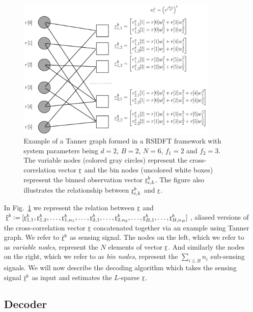 \begin{enumerate}
\begin{figure}[h!]
	\begin{center}
		\includegraphics[height=7cm]{Figures/Factorgraph} 
	\end{center}	   
	\caption{Example of a Tanner graph formed in a RSIDFT framework with system parameters being $d=2$, $B=2$, $N=6$, $f_1 = 2$ and $f_2=3$. The variable nodes (colored gray circles) represent the cross-correlation vector $\underline{\mathrm{r}}$ and the bin nodes (uncolored white boxes) represent the binned observation vector $\underline{\mathrm{r}}_{i,k}^b$. The figure also illustrates the relationship between $\underline{\mathrm{r}}_{i,k}^b$ and $\underline{\mathrm{r}}$.}\label{fig:factorgraph}
	\vspace{5 pt}
\end{figure}

In Fig.~\ref{fig:factorgraph} we represent the relation between $\underline{\mathrm{r}}$ and $\tilde{\underline{\mathrm{r}}}^{b}\mathrel{\mathop:}=[\underline{\mathrm{r}}^{b}_{1,1},\underline{\mathrm{r}}^{b}_{1,2},\ldots,\underline{\mathrm{r}}^{b}_{1,n_1},\ldots, \underline{\mathrm{r}}^{b}_{2,1},\ldots,\underline{\mathrm{r}}^{b}_{2,n_2},\ldots, \underline{\mathrm{r}}^{b}_{B,1},\ldots,\underline{\mathrm{r}}^{b}_{B,n_B}]$, aliased versions of the cross-correlation vector $\underline{\mathrm{r}}$ concatenated together via an example using Tanner graph. We refer to $\tilde{\underline{\mathrm{r}}}^{b}$ as sensing signal. The nodes on the left, which we refer to as {\it variable nodes}, represent the $N$ elements of vector $\underline{\mathrm{r}}$. And similarly the nodes on the right, which we refer to as {\it bin nodes}, represent the $\sum_{i\leq B} n_i$ sub-sensing signals. We will now describe the decoding algorithm which takes the sensing signal $\tilde{\underline{\mathrm{r}}}^b$ as input and estimates the $L$-sparse $\underline{\mathrm{r}}$.	 

\subsection{Decoder}		
	

\end{enumerate}
